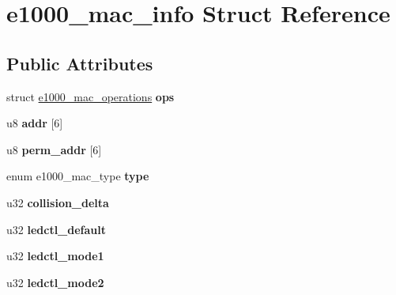 \hypertarget{structe1000__mac__info}{
\section{e1000\_\-mac\_\-info Struct Reference}
\label{structe1000__mac__info}
}
\subsection*{Public Attributes}
\begin{DoxyCompactItemize}
\item 
\hypertarget{structe1000__mac__info_ad4dc5e9b487b5986db47069021017e37}{
struct \hyperlink{structe1000__mac__operations}{e1000\_\-mac\_\-operations} {\bfseries ops}}
\label{structe1000__mac__info_ad4dc5e9b487b5986db47069021017e37}

\item 
\hypertarget{structe1000__mac__info_a6d4b5198a1a83304ea4e9de2d446b302}{
u8 {\bfseries addr} \mbox{[}6\mbox{]}}
\label{structe1000__mac__info_a6d4b5198a1a83304ea4e9de2d446b302}

\item 
\hypertarget{structe1000__mac__info_ac8b76e72b6089fa8c579a18951c5a27b}{
u8 {\bfseries perm\_\-addr} \mbox{[}6\mbox{]}}
\label{structe1000__mac__info_ac8b76e72b6089fa8c579a18951c5a27b}

\item 
\hypertarget{structe1000__mac__info_a47575986a62f26180c725bb6fd19e434}{
enum e1000\_\-mac\_\-type {\bfseries type}}
\label{structe1000__mac__info_a47575986a62f26180c725bb6fd19e434}

\item 
\hypertarget{structe1000__mac__info_a27fbaae84653058cab377cdd51c2c5d2}{
u32 {\bfseries collision\_\-delta}}
\label{structe1000__mac__info_a27fbaae84653058cab377cdd51c2c5d2}

\item 
\hypertarget{structe1000__mac__info_a60f295e7feb51440bcef989cb12e70bc}{
u32 {\bfseries ledctl\_\-default}}
\label{structe1000__mac__info_a60f295e7feb51440bcef989cb12e70bc}

\item 
\hypertarget{structe1000__mac__info_a876f73c7a9eef76091068de72a8e676f}{
u32 {\bfseries ledctl\_\-mode1}}
\label{structe1000__mac__info_a876f73c7a9eef76091068de72a8e676f}

\item 
\hypertarget{structe1000__mac__info_ab39e2630f39aa2059428fe24ef8c8fe6}{
u32 {\bfseries ledctl\_\-mode2}}
\label{structe1000__mac__info_ab39e2630f39aa2059428fe24ef8c8fe6}


\end{DoxyCompactItemize}
